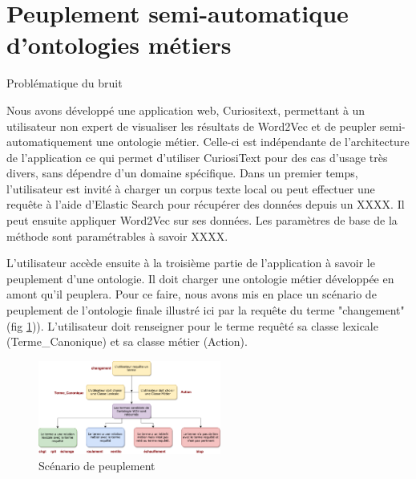 \section{Peuplement semi-automatique d'ontologies métiers}

Problématique du bruit

Nous avons développé une application web, Curiositext, permettant à un utilisateur non expert de visualiser les résultats de Word2Vec et de peupler semi-automatiquement une ontologie métier. Celle-ci est indépendante de l'architecture de l'application ce qui permet d'utiliser CuriosiText pour des cas d'usage très divers, sans dépendre d'un domaine spécifique. Dans un premier temps, l'utilisateur est invité à charger un corpus texte local ou peut effectuer une requête à l'aide d'Elastic Search pour récupérer des données depuis un XXXX. Il peut ensuite appliquer Word2Vec sur ses données. Les paramètres de base de la méthode sont paramétrables à savoir XXXX.

L'utilisateur accède ensuite à la troisième partie de l'application à savoir le peuplement d'une ontologie. Il doit charger une ontologie métier développée en amont qu'il peuplera. Pour ce faire, nous avons mis en place un scénario de peuplement de l'ontologie finale illustré ici par la requête du terme "changement" (fig  \ref{fig:peuplement})). L'utilisateur doit renseigner pour le terme requêté sa classe lexicale (Terme\_Canonique) et sa classe métier (Action).

\begin{figure}[tb]
    \begin{center}
        \includegraphics[width=6cm]{figures/peuplement}
    \end{center}
    \caption{Scénario de peuplement}\label{fig:peuplement}
\end{figure}

